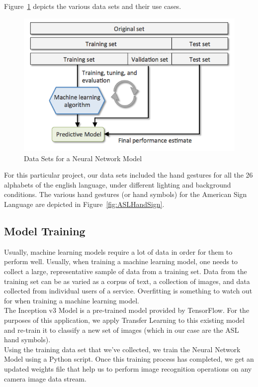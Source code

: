 \documentclass[14pt]{report}
\begin{document}
						Figure~\ref{fig:DataCollection} depicts the various data sets and their use cases.
						\begin{figure}[h]
							\includegraphics[width=\textwidth]{DataCollection.png}
							\centering
							\caption{Data Sets for a Neural Network Model}
							\label{fig:DataCollection}
						\end{figure}

						For this particular project, our data sets included the hand gestures for all the 26 alphabets of the english language, under different lighting and background conditions. The various hand gestures (or hand symbols) for the American Sign Language are depicted in Figure~\ref{fig:ASLHandSign}.
			\subsection{Model Training}
						Usually, machine learning models require a lot of data in order for them to perform well. Usually, when training a machine learning model, one needs to collect a large, representative sample of data from a training set. Data from the training set can be as varied as a corpus of text, a collection of images, and data collected from individual users of a service. Overfitting is something to watch out for when training a machine learning model.\\

						The Inception v3 Model is a pre-trained model provided by TensorFlow. For the purposes of this application, we apply Transfer Learning to this existing model and re-train it to classify a new set of images (which in our case are the ASL hand symbols).\\

						Using the training data set that we've collected, we train the Neural Network Model using a Python script. Once this training process has completed, we get an updated weights file that help us to perform image recognition operations on any camera image data stream.
						
\end{document}

